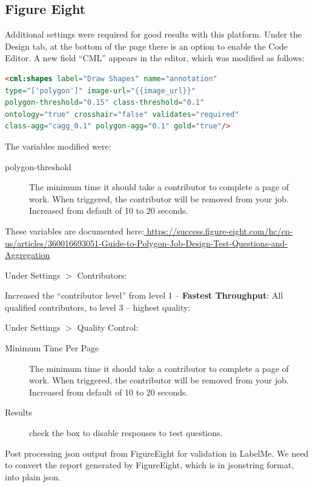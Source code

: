 \documentclass[11pt]{article} %
\begin{document}
\subsection{Figure Eight}

Additional settings were required for good results with this platform. 
Under the Design tab, at the bottom of the page there is an option to enable 
the Code Editor. A new field ``CML'' appears in the editor, which was modified 
as follows:

\begin{lstlisting}[language=html, frame=single]
<cml:shapes label="Draw Shapes" name="annotation" 
type="['polygon']" image-url="{{image_url}}" 
polygon-threshold="0.15" class-threshold="0.1" 
ontology="true" crosshair="false" validates="required" 
class-agg="cagg_0.1" polygon-agg="0.1" gold="true"/>
\end{lstlisting}

The variables modified were: 

\begin{description}
\item[polygon-threshold] The minimum time it should take a contributor to
complete a page of work. When triggered, the contributor will be removed from
your job. Increased from default of 10 to 20 seconds.
\end{description}

These variables are documented here:\url{ 
https://success.figure-eight.com/hc/en-us/articles/360016693051-Guide-to-Polygon-Job-Design-Test-Questions-and-Aggregation}

Under Settings $>$ Contributors:

Increased the ``contributor level'' from level 1 -- \textbf{Fastest
Throughput}: All qualified contributors, to level 3 -- highest quality: 

Under Settings $>$ Quality Control:

\begin{description}
\item[Minimum Time Per Page] The minimum time it should take a contributor to
complete a page of work. When triggered, the contributor will be removed from
your job. Increased from default of 10 to 20 seconds.

\item[Results] check the box to disable responses to test questions.
\end{description}

Post processing json output from FigureEight for validation in LabelMe. We need 
to convert the report generated by FigureEight, which is in jsonstring format, 
into plain json. 
\end{document}

